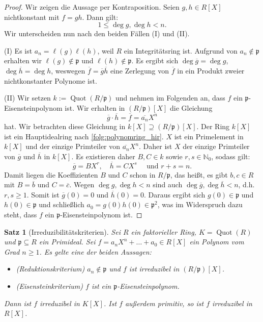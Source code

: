 \documentclass[a4paper, twoside, 11pt, ngerman]{report}
\newcommand{\NN}{\mathds N}
\DeclareMathOperator{\Quot}{Quot}
\theoremstyle{definistyle}
\newtheorem{satz}{Satz}[section]
\theoremstyle{remark}
\begin{document}
\begin{proof}
Wir zeigen die Aussage per Kontraposition.
Seien $g, h \in R[X]$ nichtkonstant mit $f = gh$. Dann gilt:
\[
1 \leq \deg g, \deg h < n.
\]
Wir unterscheiden nun nach den beiden Fällen (I) und (II).

(I) Es ist $a_n = \ell(g) \ell(h)$, weil $R$ ein Integritätsring ist. Aufgrund von $a_n \notin \mathfrak{p}$ erhalten wir $\ell(g) \notin \mathfrak{p}$ und $\ell(h) \notin \mathfrak{p}$.
Es ergibt sich $\deg\overline{g}=\deg g$, $\deg\overline{h}=\deg h$, weswegen
$\overline{f}=\overline{g}\overline{h}$ eine Zerlegung von $\overline{f}$ in ein Produkt
zweier nichtkonstanter Polynome ist.

(II) Wir setzen $k := \Quot(R / \mathfrak{p})$ und nehmen im Folgenden an, dass $f$ ein $\mathfrak{p}$-Eisensteinpolynom ist. Wir erhalten in $(R / \mathfrak{p})[X]$ die Gleichung
\[
 \overline{g} \cdot \overline{h} = \overline{f} = \overline{a_n} X^n
\]
hat. Wir betrachten diese Gleichung in $k[X] \supseteq (R / \mathfrak{p})[X]$. Der Ring $k[X]$ ist ein Hauptidealring nach \ref{folg:polynomring_hir}. $X$ ist ein Primelement in $k[X]$ und der einzige Primteiler von $\overline{a_n}X^n$. Daher ist $X$ der einzige Primteiler von $\overline{g}$ und $\overline{h}$ in $k[X]$. Es existieren daher $B, C \in k$ sowie $r, s \in \NN_0$, sodass gilt:
\[
\overline{g} = B X^r, \quad \overline{h} = C X^s \quad \text{ und } r + s = n.
\]
Damit liegen die Koeffizienten $B$ und $C$ schon in $R / \mathfrak{p}$, das heißt, es gibt $b, c \in R$ mit $B = \overline{b}$ und $C = \overline{c}$. Wegen $\deg g,\deg h<n$ sind auch $\deg \overline{g},\deg \overline{h}<n$, d.h. $r, s \geq 1$. Somit ist $\overline{g}(0) = 0$ und $\overline{h}(0) = 0$. Daraus ergibt sich $g(0) \in \mathfrak{p}$ und $h(0) \in \mathfrak{p}$ und schließlich $a_0 = g(0) h(0) \in \mathfrak{p}^2$, was im Widerspruch dazu steht, dass $f$ ein $\mathfrak{p}$-Eisensteinpolynom ist. 
\end{proof}

\begin{satz}[Irreduzibilitätskriterien]\label{satz:irreduzibilitaetskriterien}
Sei $R$ ein faktorieller Ring, $K = \Quot(R)$ und $\mathfrak{p} \subseteq R$ ein Primideal. Sei $f = a_n X^n + \dots + a_0 \in R[X]$ ein Polynom vom Grad $n\geq 1$. Es gelte eine der beiden Aussagen:
\begin{itemize}
    \item[(I)] (\textit{Reduktionskriterium}) $a_n \notin \mathfrak{p}$ und $f$ ist irreduzibel in $(R / \mathfrak{p})[X]$.
    \item[(II)] (\textit{Eisensteinkriterium}) $f$ ist ein $\mathfrak{p}$-Eisensteinpolynom.
\end{itemize}
Dann ist $f$ irreduzibel in $K[X]$. Ist $f$ außerdem primitiv, so ist $f$ irreduzibel in $R[X]$.
\end{satz}
\end{document}
